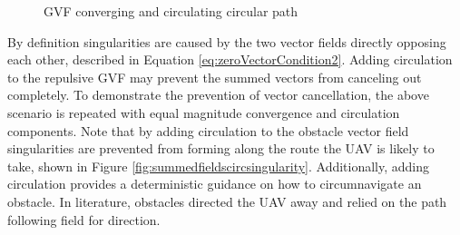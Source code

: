 \documentclass[numbered,pdftex]{ohio-etd}
\begin{document}
\begin{figure}[H]
	\begin{subfigmatrix}{2}%
		\centering	
		\hspace*{0mm}
	\end{subfigmatrix}
	\caption{GVF converging and circulating circular path}
	\label{fig:noCircSingularityDetection}
\end{figure}

By definition singularities are caused by the two vector fields directly opposing each other, described in Equation \ref{eq:zeroVectorCondition2}. Adding circulation to the repulsive GVF may prevent the summed vectors from canceling out completely. To demonstrate the prevention of vector cancellation, the above scenario is repeated with equal magnitude convergence and circulation components. Note that by adding circulation to the obstacle vector field singularities are prevented from forming along the route the UAV is likely to take, shown in Figure \ref{fig:summedfieldscircsingularity}. Additionally, adding circulation provides a deterministic guidance on how to circumnavigate an obstacle. In literature, obstacles directed the UAV away and relied on the path following field for direction. 
\end{document}
